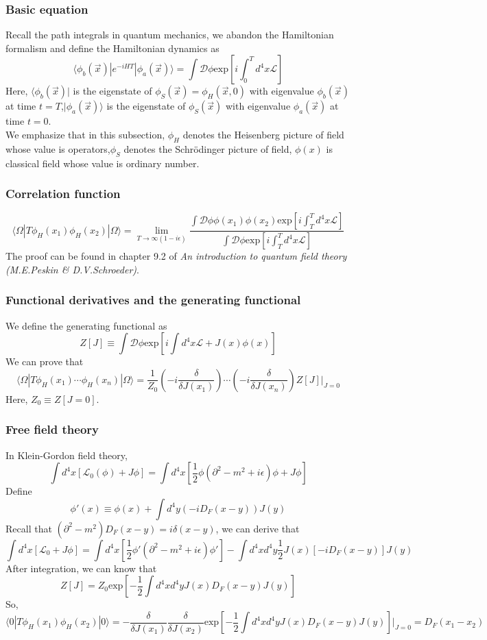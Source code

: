 \documentclass{article}
\begin{document}
\subsubsection{Basic equation}
Recall the path integrals in quantum mechanics, we abandon the Hamiltonian formalism and define the Hamiltonian dynamics as
\[\langle \phi_b(\vec{x}) | e^{-iHT} | \phi_a(\vec{x}) \rangle = \int \mathcal{D}\phi  \mathrm{exp} \left[ i\int_0^T d^4x \mathcal{L} \right]\]
Here, $\langle \phi_b(\vec{x}) |$ is the eigenstate of $\phi_S(\vec{x})=\phi_H(\vec{x},0)$ with eigenvalue $\phi_b(\vec{x})$ at time $t=T$,$| \phi_a(\vec{x}) \rangle$ is the eigenstate of $\phi_S(\vec{x})$ with eigenvalue $\phi_a(\vec{x})$ at time $t=0$.\\
We emphasize that in this subsection, $\phi_H$ denotes the Heisenberg picture of field whose value is operators,$\phi_S$ denotes the Schr\"{o}dinger picture of field, $\phi(x)$ is classical field whose value is ordinary number.

\subsubsection{Correlation function}
\[\langle \Omega | T \phi_H(x_1) \phi_H(x_2)| \Omega \rangle = \lim_{T \to \infty(1-i\epsilon)} \frac{\int \mathcal{D}\phi \phi(x_1)\phi(x_2) \mathrm{exp} \left[ i\int_T^T d^4x \mathcal{L} \right]}{\int \mathcal{D} \phi \mathrm{exp} \left[ i\int_T^T d^4x \mathcal{L} \right]}\]
The proof can be found in chapter 9.2 of \emph{An introduction to quantum field theory (M.E.Peskin \& D.V.Schroeder)}.

\subsubsection{Functional derivatives and the generating functional}
We define the generating functional as
\[Z[J] \equiv \int \mathcal{D} \phi \mathrm{exp} \left[ i\int d^4x \mathcal{L} + J(x)\phi(x) \right]\]
We can prove that
\[\langle \Omega | T \phi_H(x_1) \cdots \phi_H(x_n) | \Omega \rangle = \frac{1}{Z_0} \left( -i\frac{\delta}{\delta J(x_1)} \right)\cdots \left( -i\frac{\delta}{\delta J(x_n)} \right) Z[J]|_{J=0}\]
Here, $Z_0 \equiv Z[J=0]$.

\subsubsection{Free field theory}
In Klein-Gordon field theory,
\[\int d^4x [\mathcal{L}_0(\phi)+J\phi] = \int d^4x [\frac{1}{2}\phi (\partial^2 -m^2+i\epsilon)\phi + J\phi]\]
Define
\[\phi'(x) \equiv \phi(x) + \int d^4y (-iD_F(x-y)) J(y) \]
Recall that $(\partial^2-m^2)D_F(x-y) = i\delta(x-y)$, we can derive that
\[\int d^4x [\mathcal{L}_0+J\phi] = \int d^4x [\frac{1}{2}\phi' (\partial^2 -m^2+i\epsilon)\phi'] - \int d^4x d^4y \frac{1}{2} J(x)[-iD_F(x-y)]J(y)\]
After integration, we can know that
\[Z[J] = Z_0 \mathrm{exp} [-\frac{1}{2} \int d^4x d^4y J(x)D_F(x-y)J(y)]\]
So,
\[\langle 0 | T \phi_H(x_1) \phi_H(x_2) | 0 \rangle =  - \frac{\delta}{\delta J(x_1)} \frac{\delta}{\delta J(x_2)} \mathrm{exp} [-\frac{1}{2} \int d^4x d^4y J(x)D_F(x-y)J(y)]|_{J=0} = D_F(x_1-x_2)\]
\end{document}
